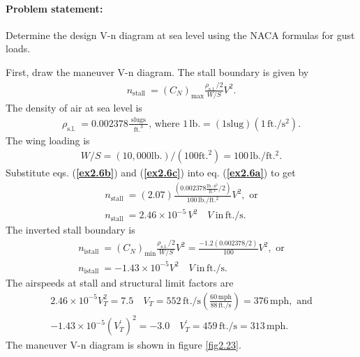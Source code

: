 \documentclass{AeroStructure-ERJohnson}
\begin{document}
\paragraph{Problem statement:}

Determine the design V-n diagram at sea level using the NACA formulas for gust loads.

\renewcommand\theequation{\alph{equation}}
\setcounter{equation}{0}

First, draw the maneuver V-n diagram. The stall boundary is given by
\begin{align}\label{ex2.6a}
n_{\text {stall }}=\left(C_{N}\right)_{\max } \frac{\rho_{\mathrm{s}.1.}/2}{W/S} V^{2}.
\end{align}
The density of air at sea level is
\begin{align}\label{ex2.6b}
\rho_{\text {s.l. }}=0.002378 \frac{\text { slugs }}{\mathrm{ft.}^{3}}\mbox{, where }1\,\mathrm{lb}.=(1 \mathrm{slug})(1\,\mathrm{ft}./\mathrm{s}^{2}).
\end{align}
The wing loading is
\begin{align}\label{ex2.6c}
W/S=(10,000 \text {lb.})/(100 \mathrm{ft.}^{2})=100\,\mathrm{lb}./\mathrm{ft}.^{2}.
\end{align}
Substitute eqs. (\textbf{\ref{ex2.6b}}) and (\textbf{\ref{ex2.6c}}) into eq. (\textbf{\ref{ex2.6a}}) to get
\begin{align}\label{ex2.6d}
n_{\text {stall }}=(2.07) \frac{\left(0.002378 \frac{\mathrm{lb} \cdot \mathrm{s}^{2}}{\mathrm{ft}.^{4}}/ 2\right)}{100\,\mathrm{lb}./\mathrm{ft}.^{2}} V^{2},\mbox{ or}\\
n_{\text {stall }}=2.46 \times 10^{-5}\,{V}^{2} \quad V~\text{in}\,\mathrm{ft}./\mathrm{s}.
\end{align}
The inverted stall boundary is
\begin{align}\label{ex2.6e}
n_{\text {istall }}=\left(C_{N}\right)_{\min } \frac{\rho_{\mathrm{s}.1.}/2}{W/S} V^{2}=\frac{-1.2(0.002378/2)}{100} V^{2},\mbox{ or}\\
n_{\text {istall }}=-1.43 \times 10^{-5} V^{2} \quad V~\text{in}\,\mathrm{ft}./\mathrm{s}.\label{ex2.6f}
\end{align}
The airspeeds at stall and structural limit factors are
\begin{align}\label{ex2.6g}
2.46 \times 10^{-5} V_{T}^{2}=7.5 \quad V_{T}=552\,\mathrm{ft}./\mathrm{s}\left(\frac{60\,\mathrm{mph}}{88\,\mathrm{ft}./ \mathrm{s}}\right)=376\,\mathrm{mph},\mbox{ and}\\
-1.43 \times 10^{-5}\left(V_{T}^{\prime}\right)^{2}=-3.0 \quad V_{T}^{\prime}=459\,\mathrm{ft}./ \mathrm{s}=313\,\mathrm{mph}.\label{ex2.6h}
\end{align}
The maneuver V-n diagram is shown in figure \ref{fig2.23}.
\end{document}
